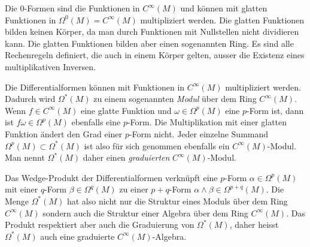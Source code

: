 Die $0$-Formen sind die Funktionen in $C^\infty(M)$ und können mit
glatten Funktionen in $\Omega^0(M)=C^\infty(M)$ multipliziert werden.
Die glatten Funktionen bilden keinen Körper, da man durch Funktionen mit
Nullstellen nicht dividieren kann.
Die glatten Funktionen bilden aber einen sogenannten Ring. 
%
Es sind alle Rechenregeln definiert, die auch in einem Körper gelten,
ausser die Existenz eines multiplikativen Inversen.

Die Differentialformen können mit Funktionen in $C^\infty(M)$
multipliziert werden.
Dadurch wird $\Omega^*(M)$ zu einem sogenannten {\em Modul} über
dem Ring $C^\infty(M)$.
Wenn $f\in C^\infty(M)$ eine glatte Funktion und $\omega\in\Omega^p(M)$
eine $p$-Form ist, dann ist $f\omega\in\Omega^p(M)$ ebenfalls eine
$p$-Form.
Die Multiplikation mit einer glatten Funktion ändert den Grad einer
$p$-Form nicht.
Jeder einzelne Summand $\Omega^p(M)\subset\Omega^*(M)$ ist also für
sich genommen ebenfalls ein $C^\infty(M)$-Modul.
Man nennt $\Omega^*(M)$ daher einen {\em graduierten} $C^\infty(M)$-Modul.
%
%

Das Wedge-Produkt der Differentialformen verknüpft eine $p$-Form
$\alpha\in\Omega^p(M)$ mit einer $q$-Form $\beta\in\Omega^q(M)$
zu einer $p+q$-Form $\alpha\wedge\beta\in\Omega^{p+q}(M)$.
Die Menge $\Omega^*(M)$ hat also nicht nur die Struktur eines
Moduls über dem Ring $C^\infty(M)$ sondern auch die Struktur
einer Algebra über dem Ring $C^\infty(M)$.
Das Produkt respektiert aber auch die Graduierung von $\Omega^*(M)$,
daher heisst $\Omega^*(M)$ auch eine graduierte $C^\infty(M)$-Algebra.

